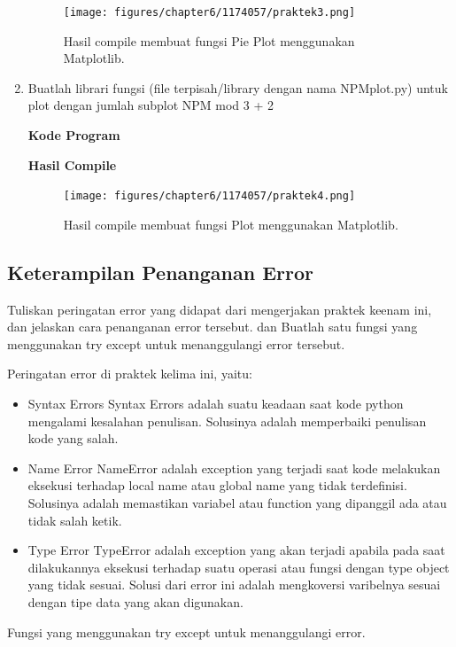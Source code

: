 \begin{enumerate}
			\begin{figure}[H]
				\texttt{[image: figures/chapter6/1174057/praktek3.png]}
				\centering
				\caption{Hasil compile membuat fungsi Pie Plot menggunakan Matplotlib.}
			\end{figure}
			
		\item Buatlah librari fungsi (file terpisah/library dengan nama NPMplot.py) untuk plot dengan jumlah subplot NPM mod 3 + 2

			\hfill \break
			\textbf{Kode Program}

			

			\hfill \break
			\textbf{Hasil Compile}

			\begin{figure}[H]
				\texttt{[image: figures/chapter6/1174057/praktek4.png]}
				\centering
				\caption{Hasil compile membuat fungsi Plot menggunakan Matplotlib.}
			\end{figure}	
	\end{enumerate}
	
	\subsection{Keterampilan Penanganan Error}
		Tuliskan  peringatan  error  yang  didapat  dari  mengerjakan  praktek  keenam  ini, dan  jelaskan  cara  penanganan  error  tersebut. dan  Buatlah  satu  fungsi  yang menggunakan try except untuk menanggulangi error tersebut.

		\hfill \break
		Peringatan error di praktek kelima ini, yaitu:
		\begin{itemize}
			\item Syntax Errors
			Syntax Errors adalah suatu keadaan saat kode python mengalami kesalahan penulisan. Solusinya adalah memperbaiki penulisan kode yang salah.
			
			\item Name Error
			NameError adalah exception yang terjadi saat kode melakukan eksekusi terhadap local name atau global name yang tidak terdefinisi. Solusinya adalah memastikan variabel atau function yang dipanggil ada atau tidak salah ketik.
			
			\item Type Error
			TypeError adalah exception yang akan terjadi apabila pada saat dilakukannya eksekusi terhadap suatu operasi atau fungsi dengan type object yang tidak sesuai. Solusi dari error ini adalah mengkoversi varibelnya sesuai dengan tipe data yang akan digunakan.
		\end{itemize}
		\hfill \break
		Fungsi yang menggunakan try except untuk menanggulangi error.

